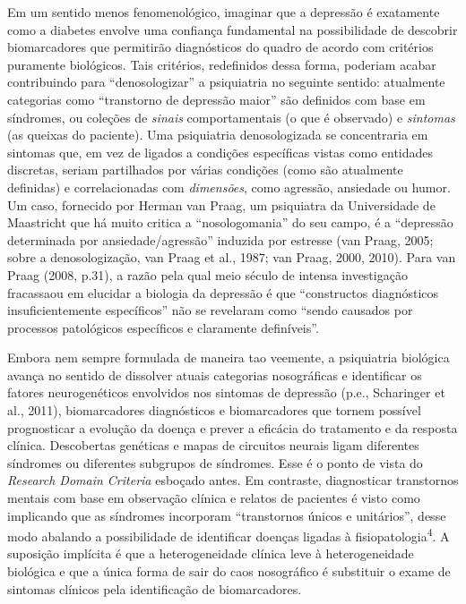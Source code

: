 Em um sentido menos fenomenológico, imaginar que a depressão é
exatamente como a diabetes envolve uma confiança fundamental na
possibilidade de descobrir biomarcadores que permitirão diagnósticos do
quadro de acordo com critérios puramente biológicos. Tais critérios,
redefinidos dessa forma, poderiam acabar contribuindo para
``denosologizar'' a psiquiatria no seguinte sentido: atualmente
categorias como ``transtorno de depressão maior'' são definidos com base
em síndromes, ou coleções de \emph{sinais} comportamentais (o que é
observado) e \emph{sintomas} (as queixas do paciente). Uma psiquiatria
denosologizada se concentraria em sintomas que, em vez de ligados a
condições específicas vistas como entidades discretas, seriam
partilhados por várias condições (como são atualmente definidas) e
correlacionadas com \emph{dimensões}, como agressão, ansiedade ou humor.
Um caso, fornecido por Herman van Praag, um psiquiatra da Universidade
de Maastricht que há muito critica a ``nosologomania'' do seu campo, é a
``depressão determinada por ansiedade/agressão'' induzida por estresse
(van Praag, 2005; sobre a denosologização, van Praag et al., 1987; van
Praag, 2000, 2010). Para van Praag (2008, p.31), a razão pela qual meio
século de intensa investigação fracassaou em elucidar a biologia da
depressão é que ``constructos diagnósticos insuficientemente
específicos'' não se revelaram como ``sendo causados por processos
patológicos específicos e claramente definíveis''.

Embora nem sempre formulada de maneira tao veemente, a psiquiatria
biológica avança no sentido de dissolver atuais categorias nosográficas
e identificar os fatores neurogenéticos envolvidos nos sintomas de
depressão (p.e., Scharinger et al., 2011), biomarcadores diagnósticos e
biomarcadores que tornem possível prognosticar a evolução da doença e
prever a eficácia do tratamento e da resposta clínica. Descobertas
genéticas e mapas de circuitos neurais ligam diferentes síndromes ou
diferentes subgrupos de síndromes. Esse é o ponto de vista do
\emph{Research Domain Criteria} esboçado antes. Em contraste,
diagnosticar transtornos mentais com base em observação clínica e
relatos de pacientes é visto como implicando que as síndromes incorporam
``transtornos únicos e unitários'', desse modo abalando a possibilidade
de identificar doenças ligadas à fisiopatologia\textsuperscript{4}. A
suposição implícita é que a heterogeneidade clínica leve à
heterogeneidade biológica e que a única forma de sair do caos
nosográfico é substituir o exame de sintomas clínicos pela identificação
de biomarcadores.

